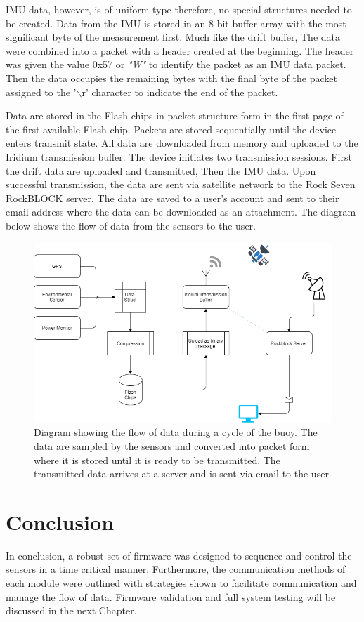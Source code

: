 IMU data, however, is of uniform type therefore, no special structures needed to be created. Data from the IMU is stored in an 8-bit buffer array with the most significant byte of the measurement first. Much like the drift buffer, The data were combined into a packet with a header created at the beginning. The header was given the value 0x57 or \textit{"W"} to identify the packet as an IMU data packet. Then the data occupies the remaining bytes with the final byte of the packet assigned to the '$\backslash$r' character to indicate the end of the packet. \par 

Data are stored in the Flash chips in packet structure form in the first page of the first available Flash chip. Packets are stored sequentially until the device enters transmit state. All data are downloaded from memory and uploaded to the Iridium transmission buffer. The device initiates two transmission sessions. First the drift data are uploaded and transmitted, Then the IMU data. Upon successful transmission, the data are sent via satellite network to the Rock Seven RockBLOCK server. The data are saved to a user's account and sent to their email address where the data can be downloaded as an attachment. The diagram below shows the flow of data from the sensors to the user.

\begin{figure}[H]
	\centering
	\includegraphics[scale = 0.5]{Data Flow Diagram.png}
	\caption{Diagram showing the flow of data during a cycle of the buoy. The data are sampled by the sensors and converted into packet form where it is stored until it is ready to be transmitted. The transmitted data arrives at a server and is sent via email to the user.}
	\label{fig:data_flow}
\end{figure}

\section{Conclusion}

In conclusion, a robust set of firmware was designed to sequence and control the sensors in a time critical manner. Furthermore, the communication methods of each module were outlined with strategies shown to facilitate communication and manage the flow of data. Firmware validation and full system testing will be discussed in the next Chapter.